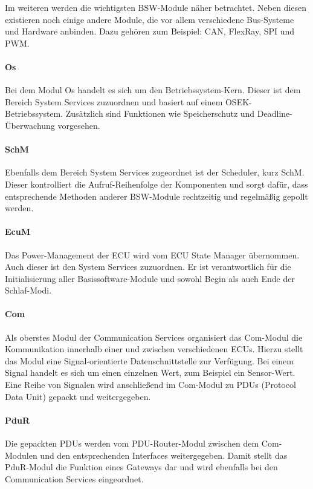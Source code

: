 \documentclass[
  a4paper,					    %
  twoside,
  DIV=calc,     				%
  bibliography=totoc,
  cleardoublepage=empty,
  ngerman,     					%
  final       					%
]{scrbook}
\begin{document}
Im weiteren werden die wichtigsten BSW-Module näher betrachtet\cite{SE_Autosar}. Neben diesen existieren noch einige andere Module, die vor allem verschiedene Bus-Systeme und Hardware anbinden. Dazu gehören zum Beispiel: CAN, FlexRay, SPI und PWM.

\paragraph{Os}
Bei dem Modul Os handelt es sich um den Betriebssystem-Kern. Dieser ist dem Bereich System Services zuzuordnen und basiert auf einem OSEK-Betriebssystem. Zusätzlich sind Funktionen wie Speicherschutz und Deadline-Überwachung vorgesehen.

\paragraph{SchM}
Ebenfalls dem Bereich System Services zugeordnet ist der Scheduler, kurz SchM. Dieser kontrolliert die Aufruf-Reihenfolge der Komponenten und sorgt dafür, dass entsprechende Methoden anderer BSW-Module rechtzeitig und regelmäßig gepollt werden.

\paragraph{EcuM}
Das Power-Management der ECU wird vom ECU State Manager übernommen. Auch dieser ist den System Services zuzuordnen. Er ist verantwortlich für die Initialisierung aller Basissoftware-Module und sowohl Begin als auch Ende der Schlaf-Modi.

\paragraph{Com}
Als oberstes Modul der Communication Services organisiert das Com-Modul die Kommunikation innerhalb einer und zwischen verschiedenen ECUs. Hierzu stellt das Modul eine Signal-orientierte Datenschnittstelle zur Verfügung. Bei einem Signal handelt es sich um einen einzelnen Wert, zum Beispiel ein Sensor-Wert. Eine Reihe von Signalen wird anschließend im Com-Modul zu PDUs (Protocol Data Unit) gepackt und weitergegeben.

\paragraph{PduR}
Die gepackten PDUs werden vom PDU-Router-Modul zwischen dem Com-Modulen und den entsprechenden Interfaces weitergegeben. Damit stellt das PduR-Modul die Funktion eines Gateways dar und wird ebenfalls bei den Communication Services eingeordnet.
\end{document}
